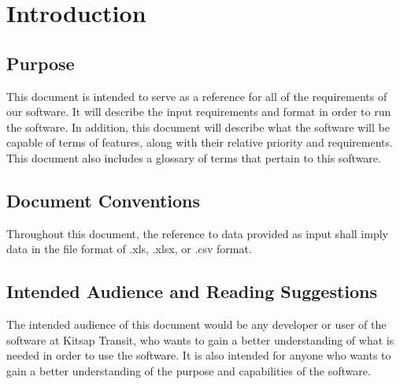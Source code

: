 \section{Introduction}

\subsection{Purpose}


This document is intended to serve as a reference for all of the requirements of our software. It will describe the input requirements and format in order to run the software. In addition, this document will describe what the software will be capable of terms of features, along with their relative priority and requirements. This document also includes a glossary of terms that pertain to this software.

\subsection{Document Conventions}

Throughout this document, the reference to data provided as input shall imply data in the file format of .xls, .xlsx, or .csv format.

\subsection{Intended Audience and Reading Suggestions}

The intended audience of this document would be any developer or user of the software at Kitsap Transit, who wants to gain a better understanding of what is needed in order to use the software. It is also intended for anyone who wants to gain a better understanding of the purpose and capabilities of the software.

